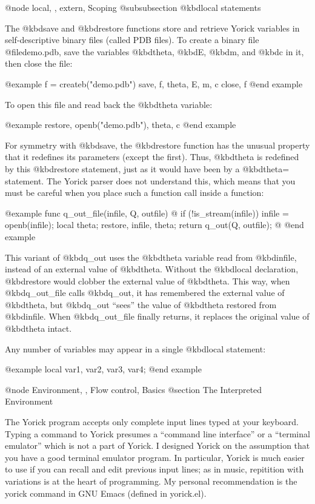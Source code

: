 {@node local,  , extern, Scoping
@subsubsection @kbd{local} statements

The @kbd{save} and @kbd{restore} functions store and retrieve Yorick
variables in self-descriptive binary files (called PDB files).  To
create a binary file @file{demo.pdb}, save the variables @kbd{theta},
@kbd{E}, @kbd{m}, and @kbd{c} in it, then close the file:

@example
f = createb("demo.pdb")
save, f, theta, E, m, c
close, f
@end example

To open this file and read back the @kbd{theta} variable:

@example
restore, openb("demo.pdb"), theta, c
@end example

For symmetry with @kbd{save}, the @kbd{restore} function has the unusual
property that it redefines its parameters (except the first).  Thus,
@kbd{theta} is redefined by this @kbd{restore} statement, just as it
would have been by a @kbd{theta=} statement.  The Yorick parser does not
understand this, which means that you must be careful when you place
such a function call inside a function:

@example
func q_out_file(infile, Q, outfile)
@{
  if (!is_stream(infile)) infile = openb(infile);
  local theta;
  restore, infile, theta;
  return q_out(Q, outfile);
@}
@end example

This variant of @kbd{q_out} uses the @kbd{theta} variable read from
@kbd{infile}, instead of an external value of @kbd{theta}.  Without the
@kbd{local} declaration, @kbd{restore} would clobber the external value
of @kbd{theta}.  This way, when @kbd{q_out_file} calls @kbd{q_out}, it
has remembered the external value of @kbd{theta}, but @kbd{q_out}
``sees'' the value of @kbd{theta} restored from @kbd{infile}.  When
@kbd{q_out_file} finally returns, it replaces the original value of
@kbd{theta} intact.

Any number of variables may appear in a single @kbd{local} statement:

@example
local var1, var2, var3, var4;
@end example


@node Environment,  , Flow control, Basics
@section The Interpreted Environment

The Yorick program accepts only complete input lines typed at your
keyboard.  Typing a command to Yorick presumes a ``command line
interface'' or a ``terminal emulator'' which is not a part of Yorick.
I designed Yorick on the assumption that you have a good terminal
emulator program.  In particular, Yorick is much easier to use if you
can recall and edit previous input lines; as in music, repitition with
variations is at the heart of programming.  My personal recommendation
is the yorick command in GNU Emacs (defined in yorick.el).

}
